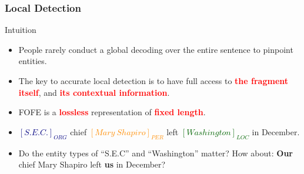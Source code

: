 \documentclass{beamer}
\begin{document}
\begin{frame}
\frametitle{Local Detection}
\begin{block}{Intuition}
	\begin{itemize}
	\item People rarely conduct a global decoding over the entire sentence to pinpoint entities.
	\item The key to accurate local detection is to have full access to
		\textbf{\textcolor{red}{the fragment itself}}, and
		\textbf{\textcolor{red}{its contextual information}}.
	\item FOFE is a \textbf{\textcolor{red}{lossless}} representation of \textbf{\textcolor{red}{fixed length}}.
	\end{itemize}
\end{block}
\begin{example}
    \begin{itemize}
    \item \textbf{\textcolor{navy}{$[S.E.C.]_{ORG}$}} chief 
            \textbf{\textcolor{darkorange}{$[Mary\ Shapiro]_{PER}$}} left 
            \textbf{\textcolor{darkgreen}{$[Washington]_{LOC}$}} in December. \\
    \item Do the entity types of ``S.E.C'' and ``Washington'' matter? How about:
    \textbf{Our} chief Mary Shapiro left \textbf{us} in December?
    \end{itemize}
\end{example}
\end{frame}
\end{document}
